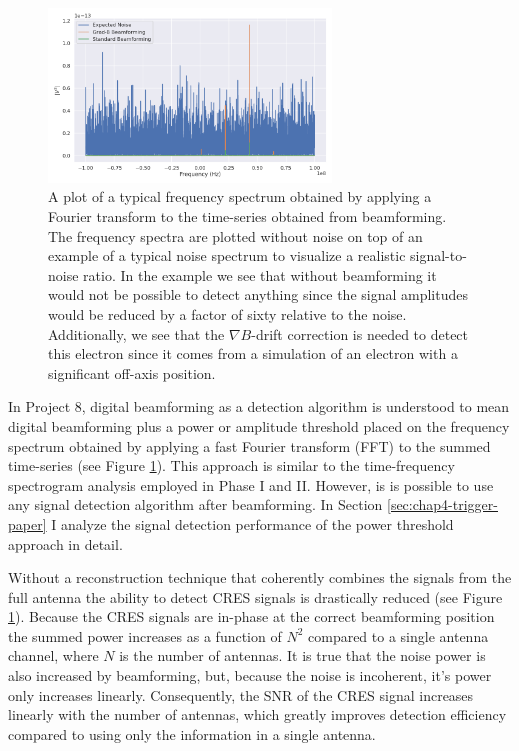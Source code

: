 \begin{figure}[htbp]
    \centering
    \includegraphics[width=0.67\textwidth]{figs/Chapter-4/220304_example_power_spectrum_gradb_vs_noise_vs_standard_bf.png}
    \caption{A plot of a typical frequency spectrum obtained by applying a Fourier transform to the time-series obtained from beamforming. The frequency spectra are plotted without noise on top of an example of a typical noise spectrum to visualize a realistic signal-to-noise ratio. In the example we see that without beamforming it would not be possible to detect anything since the signal amplitudes would be reduced by a factor of sixty relative to the noise. Additionally, we see that the $\nabla B$-drift correction is needed to detect this electron since it comes from a simulation of an electron with a significant off-axis position. }
    \label{fig:chap4-bf-signal-example}
\end{figure}

In Project 8, digital beamforming as a detection algorithm is understood to mean digital beamforming plus a power or amplitude threshold placed on the frequency spectrum obtained by applying a fast Fourier transform (FFT) to the summed time-series (see Figure \ref{fig:chap4-bf-signal-example}). This approach is similar to the time-frequency spectrogram analysis employed in Phase I and II. However, is is possible to use any signal detection algorithm after beamforming. In Section \ref{sec:chap4-trigger-paper} I analyze the signal detection performance of the power threshold approach in detail.

Without a reconstruction technique that coherently combines the signals from the full antenna the ability to detect CRES signals is drastically reduced (see Figure \ref{fig:chap4-bf-signal-example}). Because the CRES signals are in-phase at the correct beamforming position the summed power increases as a function of $N^2$ compared to a single antenna channel, where $N$ is the number of antennas. It is true that the noise power is also increased by beamforming, but, because the noise is incoherent, it's power only increases linearly. Consequently, the SNR of the CRES signal increases linearly with the number of antennas, which greatly improves detection efficiency compared to using only the information in a single antenna.

